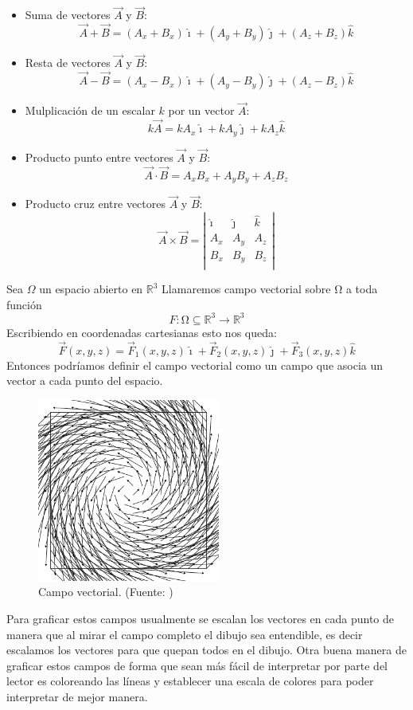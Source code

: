 \begin{itemize}
\item Suma de vectores $\vec{A}$ y $\vec{B}$:
$$\vec{A}+\vec{B}=(A_x+B_x)\hat{\imath}+(A_y+B_y)\hat{\jmath}+(A_z+B_z)\hat{k}$$
\item Resta de vectores $\vec{A}$ y $\vec{B}$:
$$\vec{A}-\vec{B}=(A_x-B_x)\hat{\imath}+(A_y-B_y)\hat{\jmath}+(A_z-B_z)\hat{k}$$
\item Mulplicación de un escalar $k$ por un vector $\vec{A}$:
$$k\vec{A}= kA_x \hat{\imath}+kA_y\hat{\jmath}+kA_z\hat{k}$$
\item Producto punto entre vectores $\vec{A}$ y $\vec{B}$:
$$\vec{A} \cdot \vec{B}= A_xB_x+A_yB_y+A_zB_z$$
\item Producto cruz entre vectores $\vec{A}$ y $\vec{B}$:
$$\vec{A} \times \vec{B}= \left| {\begin{array}{ccc}
   \hat{\imath} & \hat{\jmath} & \hat{k} \\
   A_x & A_y & A_z\\
   B_x & B_y & B_z\\
  \end{array} } \right|$$
\end{itemize}
Sea $\Omega$ un espacio abierto en $\mathbb{R}^3$ 
Llamaremos campo vectorial sobre Ω a toda función $$F : Ω ⊆ \mathbb{R}^3\rightarrow\mathbb{R}^3$$
Escribiendo en coordenadas cartesianas esto nos queda:
$$\vec{F}(x,y,z)=\vec{F}_1(x,y,z)\hat{\imath}+\vec{F}_2(x,y,z)\hat{\jmath}+\vec{F}_3(x,y,z)\hat{k}$$
Entonces podríamos definir el campo vectorial como un campo que asocia un vector a cada punto del espacio.
\begin{figure}[H]
\centering
\includegraphics[height=6cm]{Imagenes/campovec.png}
\caption{Campo vectorial. (Fuente: \cite{WikipediaVectorial})}\label{fig:Campo vectorial}
\end{figure}
Para graficar estos campos usualmente se escalan los vectores en cada punto de manera que al mirar el campo completo el dibujo sea entendible, es decir escalamos los vectores para que quepan todos en el dibujo. Otra buena manera de graficar estos campos de forma que sean más fácil de interpretar por parte del lector es coloreando las líneas y establecer una escala de colores para poder interpretar de mejor manera.
